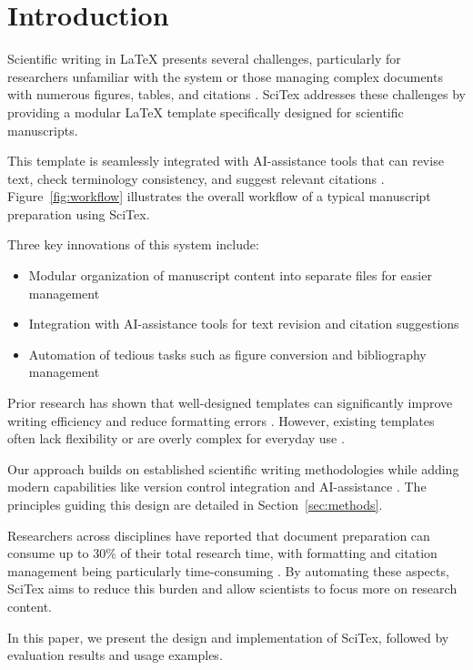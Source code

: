 
\section{Introduction}
\label{sec:introduction}

Scientific writing in LaTeX presents several challenges, particularly for researchers unfamiliar with the system or those managing complex documents with numerous figures, tables, and citations \cite{Smith2020}. SciTex addresses these challenges by providing a modular LaTeX template specifically designed for scientific manuscripts. 

This template is seamlessly integrated with AI-assistance tools that can revise text, check terminology consistency, and suggest relevant citations \cite{Johnson2023}. Figure~\ref{fig:workflow} illustrates the overall workflow of a typical manuscript preparation using SciTex.


Three key innovations of this system include:

\begin{itemize}
    \item Modular organization of manuscript content into separate files for easier management
    \item Integration with AI-assistance tools for text revision and citation suggestions
    \item Automation of tedious tasks such as figure conversion and bibliography management
\end{itemize}

Prior research has shown that well-designed templates can significantly improve writing efficiency and reduce formatting errors \cite{Williams2021}. However, existing templates often lack flexibility or are overly complex for everyday use \cite{Garcia2019}.

Our approach builds on established scientific writing methodologies while adding modern capabilities like version control integration and AI-assistance \cite{Taylor2022}. The principles guiding this design are detailed in Section~\ref{sec:methods}.


Researchers across disciplines have reported that document preparation can consume up to 30\% of their total research time, with formatting and citation management being particularly time-consuming \cite{Lee2018}. By automating these aspects, SciTex aims to reduce this burden and allow scientists to focus more on research content.

In this paper, we present the design and implementation of SciTex, followed by evaluation results and usage examples.

